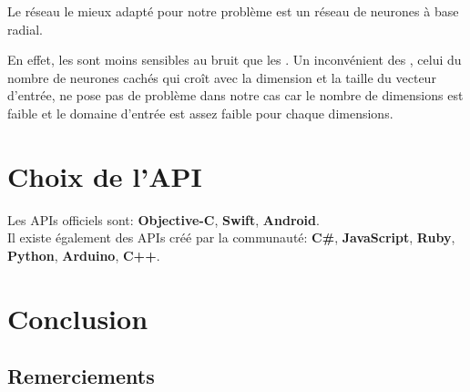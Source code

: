 \documentclass[12pt,a4paper,oneside, titlepage]{article}
\begin{document}
Le réseau le mieux adapté pour notre problème est un réseau de neurones à base radial.

En effet, les \rbf sont moins sensibles au bruit que les \mlp \cite{adversarial,Gauthier}.%
Un inconvénient des \rbf, celui du nombre de neurones cachés qui croît avec la dimension et la taille du vecteur d'entrée, ne pose pas de problème dans notre cas
car le nombre de dimensions est faible
et le domaine d'entrée est assez faible pour chaque dimensions.
\section{Choix de l'API}
Les APIs officiels sont:\cite{SDKofficiels} \textbf{Objective-C}, \textbf{Swift}, \textbf{Android}.\\
Il existe également des APIs créé par la communauté:\cite{gosphero} \textbf{C\#}, \textbf{JavaScript}, \textbf{Ruby}, \textbf{Python}\cite{pythonAPI}, \textbf{Arduino}, \textbf{C++}\cite{cppAPI}.\\
\section{Conclusion}
\subsection*{Remerciements}



\end{document}
